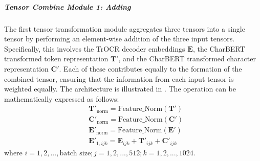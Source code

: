 \subparagraph*{Tensor Combine Module 1: Adding}
\label{subpar:3_adding}
The first tensor transformation module aggregates three tensors into a single tensor by performing an element-wise addition of the three input tensors. Specifically, this involves the TrOCR decoder embeddings $\mathbf{E}$, the CharBERT transformed token representation $\mathbf{T'}$, and the CharBERT transformed character representation $\mathbf{C'}$. Each of these contributes equally to the formation of the combined tensor, ensuring that the information from each input tensor is weighted equally. The architecture is illustrated in . The operation can be mathematically expressed as follows:
\begin{equation} \label{eq:3_tensor_combine_adding}
    \begin{split}
        &\mathbf{T'}_{\text{norm}} = \text{Feature\_Norm}(\mathbf{T}')\\
        &\mathbf{C'}_{\text{norm}} = \text{Feature\_Norm}(\mathbf{C}')\\
        &\mathbf{E'}_{\text{norm}} = \text{Feature\_Norm}(\mathbf{E}')\\
        &\mathbf{E}'_{1, ijk} = \mathbf{E}_{ijk} + \mathbf{T}'_{ijk} + \mathbf{C}'_{ijk}
    \end{split}
\end{equation}
where $i = 1, 2, ..., \text{batch size}; j = 1, 2, ..., 512; k = 1, 2, ..., 1024$.


